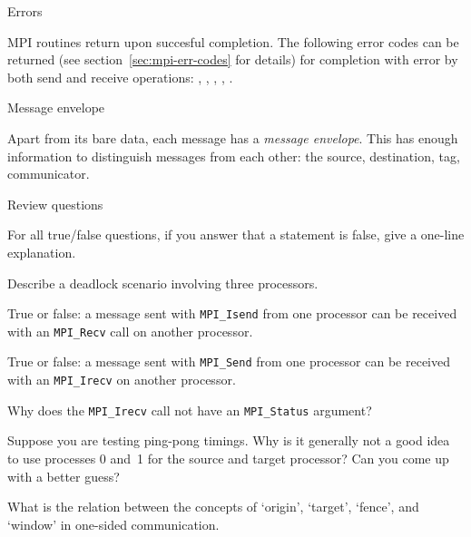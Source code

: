  {Errors}

MPI routines return  upon succesful completion.
The following error codes can be returned
(see section~\ref{sec:mpi-err-codes} for details)
for completion with error by both send and receive operations:
  ,
  ,
  ,
  ,
  .


 {Message envelope}
\label{sec:mpi-envelope}

Apart from its bare data, each message has a \emph{message envelope}.
This has enough information to distinguish messages from each other:
the source, destination, tag, communicator.


 {Review questions}

For all true/false questions, if you answer that a statement is false,
give a one-line explanation.

\begin{review}
  Describe a deadlock scenario involving three processors.
\end{review}

\begin{review}
  True or false: a message sent with \lstinline{MPI_Isend} from one processor can be
  received with an \lstinline{MPI_Recv} call on another processor.
\end{review}

\begin{review}
  True or false: a message sent with \lstinline{MPI_Send} from one processor can be
  received with an \lstinline{MPI_Irecv} on another processor.
\end{review}

\begin{review}
  Why does the \lstinline{MPI_Irecv} call not have an \lstinline{MPI_Status} argument?
\end{review}

\begin{review}
  Suppose you are testing ping-pong timings.
  Why is it generally not a good idea to use processes 0 and~1 for the
  source and target processor?  Can you come up with a better guess?
\end{review}

\begin{review}
  What is the relation between the concepts of `origin', `target', `fence',
  and `window' in one-sided communication.
\end{review}

